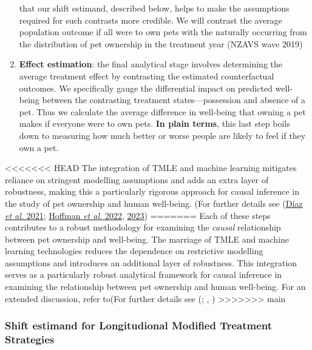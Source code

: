 \documentclass[
  singlecolumn,
  9pt]{article}
\begin{document}
\begin{enumerate}
  that our shift estimand, described below, helps to make the
  assumptions required for such contrasts more credible. We will
  contrast the average population outcome if all were to own pets with
  the naturally occurring from the distribution of pet ownership in the
  treatment year (NZAVS wave 2019)
\item
  \textbf{Effect estimation}: the final analytical stage involves
  determining the average treatment effect by contrasting the estimated
  counterfactual outcomes. We specifically gauge the differential impact
  on predicted well-being between the contrasting treatment
  states---possession and absence of a pet. Thus we calculate the
  average difference in well-being that owning a pet makes if everyone
  were to own pets. \textbf{In plain terms}, this last step boils down
  to measuring how much better or worse people are likely to feel if
  they own a pet.
\end{enumerate}

<<<<<<< HEAD
The integration of TMLE and machine learning mitigates reliance on
stringent modelling assumptions and adds an extra layer of robustness,
making this a particularly rigorous approach for causal inference in the
study of pet ownership and human well-being. (For further details see
(\hyperref[ref-duxedaz2021]{Díaz \emph{et al.} 2021};
\hyperref[ref-hoffman2022]{Hoffman \emph{et al.} 2022},
\hyperref[ref-hoffman2023]{2023})
=======
Each of these steps contributes to a robust methodology for examining
the \emph{causal} relationship between pet ownership and well-being. The
marriage of TMLE and machine learning technologies reduces the
dependence on restrictive modelling assumptions and introduces an
additional layer of robustness. This integration serves as a
particularly robust analytical framework for causal inference in
examining the relationship between pet ownership and human well-being.
For an extended discussion, refer to(For further details see
(;
,
)
>>>>>>> main

\subsubsection{Shift estimand for Longitudional Modified Treatment
Strategies}\label{shift-estimand-for-longitudional-modified-treatment-strategies}
\end{document}
